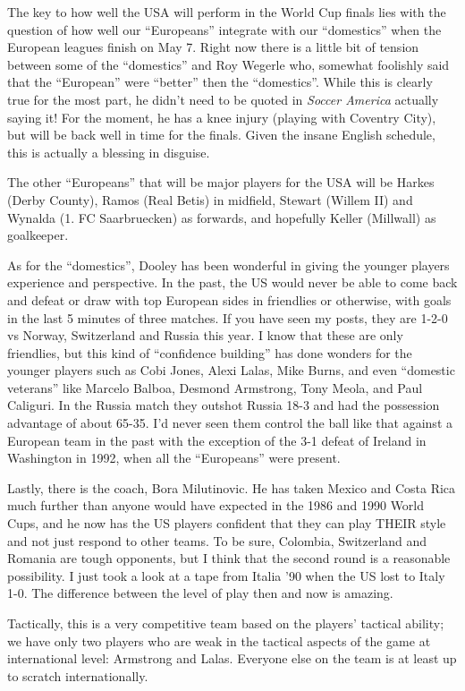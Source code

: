 The key to how well the USA will perform in the World Cup finals lies with the
question of how well our ``Europeans'' integrate with our ``domestics'' when the 
European leagues finish on May 7. Right now there is a little bit of tension 
between some of the ``domestics'' and Roy Wegerle who, somewhat foolishly said 
that the ``European'' were ``better'' then the ``domestics''. While this is clearly
true for the most part, he didn't need to be quoted in \textit{Soccer America} 
actually saying it! For the moment, he has a knee injury (playing with Coventry
City), but will be back well in time for the finals. Given the insane English
schedule, this is actually a blessing in disguise.

The other ``Europeans'' that will be major players for the USA will be Harkes 
(Derby County), Ramos (Real Betis) in midfield, Stewart (Willem II) and Wynalda
(1. FC Saarbruecken) as forwards, and hopefully Keller (Millwall) as 
goalkeeper.

As for the ``domestics'', Dooley has been wonderful in giving the younger players
experience and perspective. In the past, the US would never be able to come 
back and defeat or draw with top European sides in friendlies or otherwise,
with goals in the last 5 minutes of three matches. If you have seen my posts, 
they are 1-2-0 vs Norway, Switzerland and Russia this year. I know that these 
are only friendlies, but this kind of ``confidence building'' has done wonders
for the younger players such as Cobi Jones, Alexi Lalas, Mike Burns, and even 
``domestic veterans'' like Marcelo Balboa, Desmond Armstrong, Tony Meola, and 
Paul Caliguri. In the Russia match they outshot Russia 18-3 and had the 
possession advantage of about 65-35. I'd never seen  them control the ball 
like that against a European team in the past with the exception of the 3-1 
defeat of Ireland in Washington in 1992, when all the ``Europeans'' were present.

Lastly, there is the coach, Bora Milutinovic. He has taken Mexico and Costa 
Rica much further than anyone would have expected in the 1986 and 1990 World 
Cups, and he now has the US players confident that they can play THEIR style 
and not just respond to other teams. To be sure, Colombia, Switzerland and 
Romania are tough opponents, but I think that the second round is a reasonable
possibility. I just took a look at a tape from Italia '90 when the US lost to 
Italy 1-0. The difference between the level of play then and now is amazing.

Tactically, this is a very competitive team based on the players' tactical
ability; we have only two players who are weak in the tactical aspects of the 
game at international level: Armstrong and Lalas. Everyone else on the team is 
at least up to scratch internationally.

